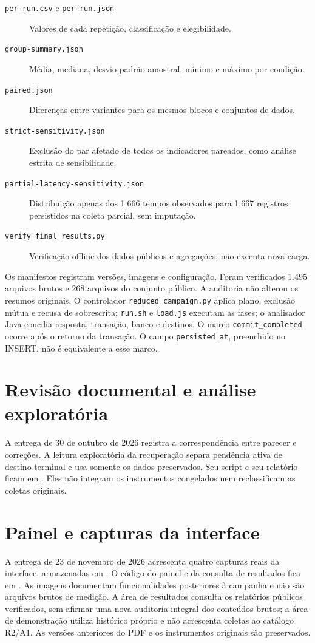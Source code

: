 \begin{description}
\item[\texttt{per-run.csv} e \texttt{per-run.json}] Valores de cada repetição, classificação e elegibilidade.
\item[\texttt{group-summary.json}] Média, mediana, desvio-padrão amostral, mínimo e máximo por condição.
\item[\texttt{paired.json}] Diferenças entre variantes para os mesmos blocos e conjuntos de dados.
\item[\texttt{strict-sensitivity.json}] Exclusão do par afetado de todos os indicadores pareados, como análise estrita de sensibilidade.
\item[\texttt{partial-latency-sensitivity.json}] Distribuição apenas dos 1.666 tempos observados para 1.667 registros persistidos na coleta parcial, sem imputação.
\item[\texttt{verify\_final\_results.py}] Verificação offline dos dados públicos e agregações; não executa nova carga.
\end{description}

Os manifestos registram versões, imagens e configuração. Foram verificados 1.495 arquivos brutos e 268 arquivos do conjunto público. A auditoria não alterou os resumos originais. O controlador \texttt{reduced\_campaign.py} aplica plano, exclusão mútua e recusa de sobrescrita; \texttt{run.sh} e \texttt{load.js} executam as fases; o analisador Java concilia resposta, transação, banco e destinos. O marco \texttt{commit\_completed} ocorre após o retorno da transação. O campo \texttt{persisted\_at}, preenchido no INSERT, não é equivalente a esse marco.

\section{Revisão documental e análise exploratória}
A entrega de 30 de outubro de 2026 registra a correspondência entre parecer e correções. A leitura exploratória da recuperação separa pendência ativa de destino terminal e usa somente os dados preservados. Seu script e seu relatório ficam em . Eles não integram os instrumentos congelados nem reclassificam as coletas originais.

\section{Painel e capturas da interface}
A entrega de 23 de novembro de 2026 acrescenta quatro capturas reais da interface, armazenadas em . O código do painel e da consulta de resultados fica em . As imagens documentam funcionalidades posteriores à campanha e não são arquivos brutos de medição. A área de resultados consulta os relatórios públicos verificados, sem afirmar uma nova auditoria integral dos conteúdos brutos; a área de demonstração utiliza histórico próprio e não acrescenta coletas ao catálogo R2/A1. As versões anteriores do PDF e os instrumentos originais são preservados.
